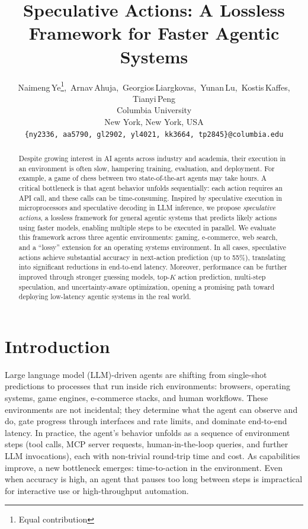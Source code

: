 \documentclass{article} %
\title{Speculative Actions: A Lossless Framework for Faster Agentic Systems}
\author{Naimeng\,Ye\thanks{Equal contribution},\, Arnav\,Ahuja\footnotemark[1],\, Georgios\,Liargkovas\footnotemark[1],\, Yunan\,Lu\footnotemark[1],\, Kostis\,Kaffes, Tianyi\,Peng \\
Columbia University\\
New York, New York, USA \\
\texttt{\{ny2336, aa5790, gl2902, yl4021, kk3664, tp2845\}@columbia.edu}
}
\theoremstyle{plain} %
\theoremstyle{definition} %
\theoremstyle{remark} %
\begin{document}
\maketitle

\begin{abstract}
Despite growing interest in AI agents across industry and academia, their execution in an environment is often slow, hampering training, evaluation, and deployment. For example, a game of chess between  two state-of-the-art agents may take hours. A critical bottleneck is that agent behavior unfolds sequentially: each action requires an API call, and these calls can be time-consuming. Inspired by speculative execution in microprocessors and speculative decoding in LLM inference, we propose \emph{speculative actions}, a lossless framework for general agentic systems that predicts likely actions using faster models, enabling multiple steps to be executed in parallel. We evaluate this framework across three agentic environments: gaming, e-commerce, web search, and a ``lossy'' extension for an operating systems environment. In all cases, speculative actions achieve substantial accuracy in next-action prediction (up to 55\%), translating into significant reductions in end-to-end latency. Moreover, performance can be further improved through stronger guessing models, top-$K$ action prediction, multi-step speculation, and uncertainty-aware optimization, opening a promising path toward deploying low-latency agentic systems in the real world.
\end{abstract}
\vspace{-10pt}
\section{Introduction}
\label{sec:intro}
Large language model (LLM)-driven agents are shifting from single-shot predictions to processes that run inside rich environments: browsers, operating systems, game engines, e-commerce stacks, and human workflows.
These environments are not incidental; they determine what the agent can observe and do, gate progress through interfaces and rate limits, and dominate end-to-end latency.
In practice, the agent’s behavior unfolds as a sequence of environment steps (tool calls, MCP server requests, human-in-the-loop queries, and further LLM invocations), each with non-trivial round-trip time and cost.
As capabilities improve, a new bottleneck emerges: time-to-action in the environment.
Even when accuracy is high, an agent that pauses too long between steps is impractical for interactive use or high-throughput automation. 
\end{document}
